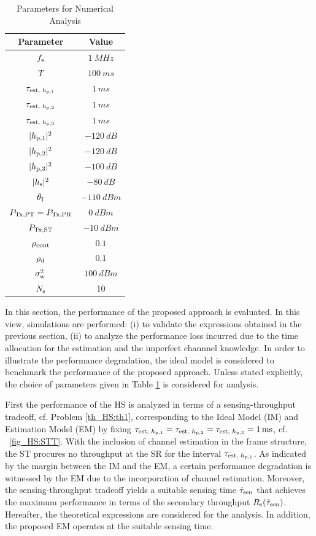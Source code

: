 \begin{table}
\renewcommand{\arraystretch}{1.4}
\caption{Parameters for Numerical Analysis}
\label{tb_HS:tb2}
\centering
\begin{tabular}{c||c}
\hline
\bfseries Parameter & \bfseries Value \\
\hline\hline
$f_{\text{s}}$ & $\SI{1}{MHz}$ \\ 
$T$ & $\SI{100}{ms}$ \\ 
$\tau_{\text{est, $h_{\text{p,1}}$}}$ & $\SI{1}{ms}$ \\
$\tau_{\text{est, $h_{\text{p,2}}$}}$ & $\SI{1}{ms}$ \\
$\tau_{\text{est, $h_{\text{p,3}}$}}$ & $\SI{1}{ms}$ \\
$|h_{\text{p,1}}|^2$ & $\SI{-120}{dB}$ \\ 
$|h_{\text{p,2}}|^2$ & $\SI{-120}{dB}$ \\ 
$|h_{\text{p,3}}|^2$ & $\SI{-100}{dB}$ \\ 
$|h_{\text{s}}|^2$ & $\SI{-80}{dB}$ \\ 
$\theta_{\text{I}}$ & $\SI{-110}{dBm}$ \\ 
$P_{\text{Tx,PT}} = P_{\text{Tx,PR}}$ & $\SI{0}{dBm}$ \\ 
$P_{\text{Tx,ST}}$ & $\SI{-10}{dBm}$ \\ 
$\rho_{\text{cont}}$ & $0.1$ \\
$\rho_{\text{d}}$ & $0.1$ \\
$\sigma^2_{\text{w}}$ & $\SI{100}{dBm}$ \\
$N_{\text{s}}$ & 10 \\ \hline
\end{tabular}
\end{table}

In this section, the performance of the proposed approach is evaluated. In this view, simulations are performed: (i) to validate the expressions obtained in the previous section, (ii) to analyze the performance loss incurred due to the time allocation for the estimation and the imperfect channnel knowledge. In order to illustrate the performance degradation, the ideal model is considered to benchmark the performance of the proposed approach. Unless stated explicitly, the choice of parameters given in Table \ref{tb_HS:tb2} is considered for analysis. 

First the performance of the HS is analyzed in terms of a sensing-throughput tradeoff, cf. Problem \ref{th_HS:th1}, corresponding to the Ideal Model (IM) and Estimation Model (EM) by fixing $\tau_{\text{est, $h_{\text{p,1}}$}} = \tau_{\text{est, $h_{\text{p,2}}$}} =  \tau_{\text{est, $h_{\text{p,3}}$}} = \SI{1}{ms}$, cf. \figurename~\ref{fig_HS:STT}. With the inclusion of channel estimation in the frame structure, the ST procures no throughput at the SR for the interval $\tau_{\text{est, $h_{\text{p,1}}$}}$. As indicated by the margin between the IM and the EM, a certain performance degradation is witnessed by the EM due to the incorporation of channel estimation. Moreover, the sensing-throughput tradeoff yields a suitable sensing time $\tilde{\tau}_{\text{sen}}$ that achieves the maximum performance in terms of the secondary throughput $R_{\text{s}}(\tilde{\tau}_{\text{sen}})$. Hereafter, the theoretical expressions are considered for the analysis. In addition, the proposed EM operates at the suitable sensing time. 



